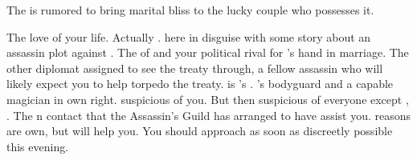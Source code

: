 \documentclass[char]{NeptuneBall}
\begin{document}
\begin{itemz}[Trivia]
  \item The \iGlowShell{\MYname} is rumored to bring marital bliss to the lucky couple who possesses it.
\end{itemz}

\begin{contacts}
  \contact{\cPrincess{}} The love of your life.
  \contact{\cQueen{\MYname}} Actually \cQueen{}. \cQueen{\They} \cQueen{\are} here in disguise with some story about an assassin plot against \cKing{\King} \cKing{}.
  \contact{\cPrince{}} The \cPrince{\prince} of \pPacifica{} and your political rival for \cPrincess{}'s hand in marriage.
  \contact{\cSpy{}} The other diplomat assigned to see the treaty through, a fellow assassin who will likely expect you to help torpedo the treaty. \cSpy{} is \cBodyguard{}'s \cSpy{\sibling}.
  \contact{\cBodyguard{}} \cPrince{}'s bodyguard and a capable magician in \cBodyguard{\their} own right. \cBodyguard{\They}  suspicious of you. But then \cBodyguard{\they} \cBodyguard{\are} suspicious of everyone except \cBodyguard{\their} \cSpy{\sibling}, \cSpy{}.
  \contact{\cManta{}} The \pAtlantis{}n contact that the Assassin's Guild has arranged to have assist you. \cManta{\Their} reasons are \cManta{\their} own, but \cManta{\they} will help you. You should approach \cManta{\them} as soon as discreetly possible this evening.
\end{contacts}
\end{document}
